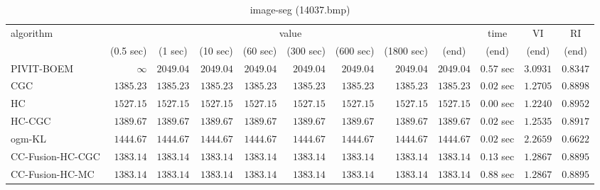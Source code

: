 \begin{table}[H]
\scriptsize
\centering
\caption{image-seg (14037.bmp)}
\label{tab:anytimetable-image-seg-14037.bmp}
\begin{tabular}{lrrrrrrrrrrr}
\toprule
           algorithm &                                   \multicolumn{8}{c}{value} & \multicolumn{1}{c}{time}    & \multicolumn{1}{c}{VI}  & \multicolumn{1}{c}{RI} \\  
\cmidrule(lr){2-9}\cmidrule(lr){10-10} \cmidrule(lr){11-11} \cmidrule(lr){12-12}   
                     & \multicolumn{1}{c}{(0.5 sec)} & \multicolumn{1}{c}{(1 sec)} & \multicolumn{1}{c}{(10 sec)} & \multicolumn{1}{c}{(60 sec)} & \multicolumn{1}{c}{(300 sec)} & \multicolumn{1}{c}{(600 sec)} & \multicolumn{1}{c}{(1800 sec)} & \multicolumn{1}{c}{(end)} & \multicolumn{1}{c}{(end)}    & \multicolumn{1}{c}{(end)}   & \multicolumn{1}{c}{(end)}  \\ \midrule 
          PIVIT-BOEM & $\infty$ & $      2049.04$ & $      2049.04$ & $      2049.04$ & $      2049.04$ & $      2049.04$ & $      2049.04$ & $      2049.04$ & $         0.57$ sec    & $       3.0931$  & $       0.8347$ \\ 
                 CGC & $      1385.23$ & $      1385.23$ & $      1385.23$ & $      1385.23$ & $      1385.23$ & $      1385.23$ & $      1385.23$ & $      1385.23$ & $         0.02$ sec    & $       1.2705$  & $       0.8898$ \\ 
                  HC & $      1527.15$ & $      1527.15$ & $      1527.15$ & $      1527.15$ & $      1527.15$ & $      1527.15$ & $      1527.15$ & $      1527.15$ & $         0.00$ sec    & $       1.2240$  & $       0.8952$ \\ 
              HC-CGC & $      1389.67$ & $      1389.67$ & $      1389.67$ & $      1389.67$ & $      1389.67$ & $      1389.67$ & $      1389.67$ & $      1389.67$ & $         0.02$ sec    & $       1.2535$  & $       0.8917$ \\ 
              ogm-KL & $      1444.67$ & $      1444.67$ & $      1444.67$ & $      1444.67$ & $      1444.67$ & $      1444.67$ & $      1444.67$ & $      1444.67$ & $         0.02$ sec    & $       2.2659$  & $       0.6622$ \\ 
    CC-Fusion-HC-CGC & $      1383.14$ & $      1383.14$ & $      1383.14$ & $      1383.14$ & $      1383.14$ & $      1383.14$ & $      1383.14$ & $      1383.14$ & $         0.13$ sec    & $       1.2867$  & $       0.8895$ \\ 
     CC-Fusion-HC-MC & $      1383.14$ & $      1383.14$ & $      1383.14$ & $      1383.14$ & $      1383.14$ & $      1383.14$ & $      1383.14$ & $      1383.14$ & $         0.88$ sec    & $       1.2867$  & $       0.8895$ \\ 

\end{tabular}
\end{table}
